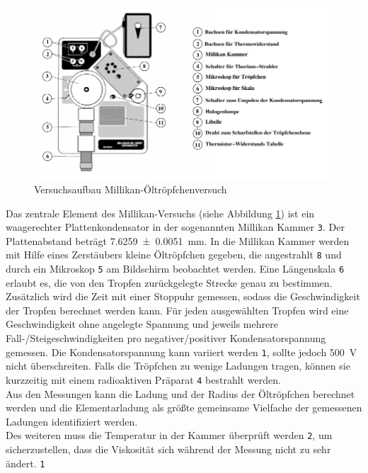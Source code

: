 \begin{figure}[h!]
	\centering
	\includegraphics[width=\textwidth]{Versuchsaufbau.png}
	\caption{Versuchsaufbau Millikan-Öltröpfchenversuch \cite{V503}}
	\label{fig:versuchsaufbau}
\end{figure}


Das zentrale Element des Millikan-Versuchs (siehe Abbildung \ref{fig:versuchsaufbau}) ist ein waagerechter Plattenkondensator in der sogenannten Millikan Kammer {\large\textcircled{\normalsize \texttt{3}}}. Der Plattenabstand beträgt \SI{7.6259+-0.0051}{\milli\meter}. In die Millikan Kammer werden mit Hilfe eines Zerstäubers kleine Öltröpfchen gegeben, die angestrahlt {\large\textcircled{\normalsize \texttt{8}}} und durch ein Mikroskop {\large\textcircled{\normalsize \texttt{5}}} am Bildschirm beobachtet werden. Eine Längenskala {\large\textcircled{\normalsize \texttt{6}}} erlaubt es, die von den Tropfen zurückgelegte Strecke genau zu bestimmen. Zusätzlich wird die Zeit mit einer Stoppuhr gemessen, sodass die Geschwindigkeit der Tropfen berechnet werden kann. Für jeden ausgewählten Tropfen wird eine Geschwindigkeit ohne angelegte Spannung und jeweils mehrere Fall-/Steigeschwindigkeiten pro negativer/positiver Kondensatorspannung gemessen. Die Kondensatorspannung kann variiert werden {\large\textcircled{\normalsize \texttt{1}}}, sollte jedoch \SI{500}{\volt} nicht überschreiten. Falls die Tröpfchen zu wenige Ladungen tragen, können sie kurzzeitig mit einem radioaktiven Präparat {\large\textcircled{\normalsize \texttt{4}}} bestrahlt werden. \\
Aus den Messungen kann die Ladung und der Radius der Öltröpfchen berechnet werden und die Elementarladung als größte gemeinsame Vielfache der gemessenen Ladungen identifiziert werden. \\
Des weiteren muss die Temperatur in der Kammer überprüft werden {\large\textcircled{\normalsize \texttt{2}}}, um sicherzustellen, dass die Viskosität sich während der Messung nicht zu sehr ändert.
{\large\textcircled{\normalsize \texttt{1}}}